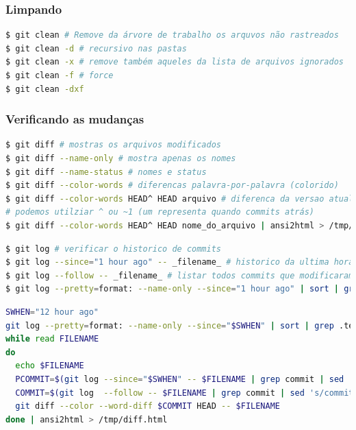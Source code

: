 \begin{frame}[fragile]
\frametitle{Limpando}
\begin{lstlisting}[language=bash, label=lst-git-clean, caption={Removendo arquivos denecessários.}, postbreak=\mbox{$\hookrightarrow$\space}, basicstyle=\fontsize{8}{10}\selectfont\ttfamily]
$ git clean # Remove da árvore de trabalho os arquvos não rastreados
$ git clean -d # recursivo nas pastas
$ git clean -x # remove também aqueles da lista de arquivos ignorados
$ git clean -f # force
$ git clean -dxf 
\end{lstlisting}
\end{frame}


\begin{frame}
\frametitle{Verificando as mudanças}
\begin{lstlisting}[language=bash, label=lst-git-diff, caption={Analisando as mudanças realizadas.}, postbreak=\mbox{$\hookrightarrow$\space}, basicstyle=\fontsize{8}{10}\selectfont\ttfamily]
$ git diff # mostras os arquivos modificados
$ git diff --name-only # mostra apenas os nomes
$ git diff --name-status # nomes e status
$ git diff --color-words # diferencas palavra-por-palavra (colorido)
$ git diff --color-words HEAD^ HEAD arquivo # diferenca da versao atual com o commit anterior
# podemos utilziar ^ ou ~1 (um representa quando commits atrás)
$ git diff --color-words HEAD^ HEAD nome_do_arquivo | ansi2html > /tmp/diff.html # gerar um relatio em HTML
\end{lstlisting}

\framebreak

\begin{lstlisting}[language=bash, label=lst-git-log, caption={Log das alterações.}, postbreak=\mbox{$\hookrightarrow$\space}, basicstyle=\fontsize{8}{10}\selectfont\ttfamily]
$ git log # verificar o historico de commits
$ git log --since="1 hour ago" -- _filename_ # historico da ultima hora para um arquivo
$ git log --follow -- _filename_ # listar todos commits que modificaram um arquivo
$ git log --pretty=format: --name-only --since="1 hour ago" | sort | grep .tex | uniq # para listar todos os arquivos que foram modificados na ultima hora
\end{lstlisting}

\framebreak

\begin{lstlisting}[language=bash, label=lst-git-diff2, caption={Script para gerar um relatório das mudanças nas últimas horas em arquivos \texttt{.tex}.}, postbreak=\mbox{$\hookrightarrow$\space}, basicstyle=\fontsize{8}{10}\selectfont\ttfamily]
SWHEN="12 hour ago"
git log --pretty=format: --name-only --since="$SWHEN" | sort | grep .tex | uniq |
while read FILENAME
do
  echo $FILENAME
  PCOMMIT=$(git log --since="$SWHEN" -- $FILENAME | grep commit | sed 's/commit //g' | tail -n 1)
  COMMIT=$(git log  --follow -- $FILENAME | grep commit | sed 's/commit //g' | sed -e "1,/$PCOMMIT/d" | head -n 1)
  git diff --color --word-diff $COMMIT HEAD -- $FILENAME
done | ansi2html > /tmp/diff.html
\end{lstlisting}
\end{frame}






